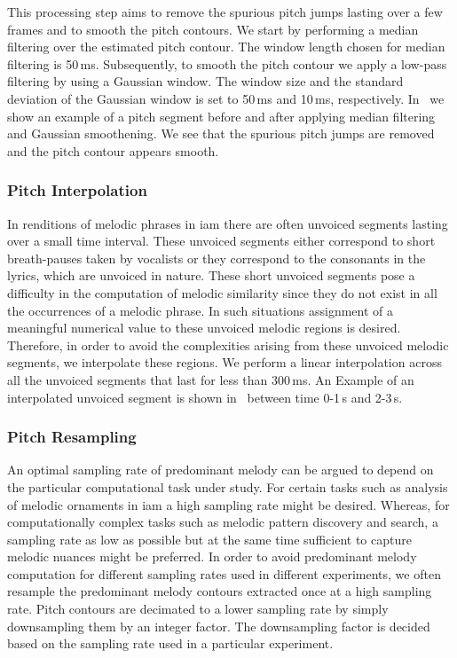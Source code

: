 {This processing step aims to remove the spurious pitch jumps lasting over a few frames and to smooth the pitch contours. We start by performing a median filtering over the estimated pitch contour. The window length chosen for median filtering is 50\,ms. Subsequently, to smooth the pitch contour we apply a low-pass filtering by using a Gaussian window. The window size and the standard deviation of the Gaussian window is set to 50\,ms and 10\,ms, respectively. In~ we show an example of a pitch segment before and after applying median filtering and Gaussian smoothening. We see that the spurious pitch jumps are removed and the pitch contour appears smooth.



\subsubsection{Pitch Interpolation}
\label{sec:data_processing_pitch_interpolation}

In renditions of melodic phrases in \gls{iam} there are often unvoiced segments lasting over a small time interval. These unvoiced segments either correspond to short breath-pauses taken by vocalists or they correspond to the consonants in the lyrics, which are unvoiced in nature. These short unvoiced segments pose a difficulty in the computation of melodic similarity since they do not exist in all the occurrences of a melodic phrase. In such situations assignment of a meaningful numerical value to these unvoiced melodic regions is desired. Therefore, in order to avoid the complexities arising from these unvoiced melodic segments, we interpolate these regions. We perform a linear interpolation across all the unvoiced segments that last for less than 300\,ms. An Example of an interpolated unvoiced segment is shown in~ between time 0-1\,s and 2-3\,s.

\subsubsection{Pitch Resampling}
\label{sec:data_processing_pitch_resampling}

An optimal sampling rate of predominant melody can be argued to depend on the particular computational task under study. For certain tasks such as analysis of melodic ornaments in \gls{iam} a high sampling rate might be desired. Whereas, for computationally complex tasks such as melodic pattern discovery and search, a sampling rate as low as possible but at the same time sufficient to capture melodic nuances might be preferred. In order to avoid predominant melody computation for different sampling rates used in different experiments, we often resample the predominant melody contours extracted once at a high sampling rate. Pitch contours are decimated to a lower sampling rate by simply downsampling them by an integer factor. The downsampling factor is decided based on the sampling rate used in a particular experiment.

}
